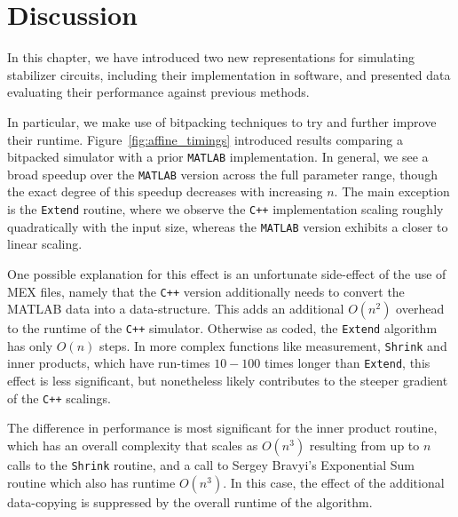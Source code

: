 \section{Discussion}
In this chapter, we have introduced two new representations for simulating stabilizer circuits, including their implementation in software, and presented data evaluating their performance against previous methods.\par
In particular, we make use of bitpacking techniques to try and further improve their runtime. Figure~\ref{fig:affine_timings} introduced results comparing a bitpacked simulator with a prior \texttt{MATLAB} implementation. In general, we see a broad speedup over the \texttt{MATLAB} version across the full parameter range, though the exact degree of this speedup decreases with increasing $n$. The main exception is the \texttt{Extend} routine, where we observe the \texttt{C++} implementation scaling roughly quadratically with the input size, whereas the \texttt{MATLAB} version exhibits a closer to linear scaling.\par
One possible explanation for this effect is an unfortunate side-effect of the use of MEX files, namely that the \texttt{C++} version additionally needs to convert the MATLAB data into a  data-structure. This adds an additional $O(n^{2})$ overhead to the runtime of the \texttt{C++} simulator. Otherwise as coded, the \texttt{Extend} algorithm has only $O(n)$ steps. In more complex functions like measurement, \texttt{Shrink} and inner products, which have run-times $10-100$ times longer than \texttt{Extend}, this effect is less significant, but nonetheless likely contributes to the steeper gradient of the \texttt{C++} scalings.\par
The difference in performance is most significant for the inner product routine, which has an overall complexity that scales as $O(n^{3})$ resulting from up to $n$ calls to the \texttt{Shrink} routine, and a call to Sergey Bravyi's Exponential Sum routine which also has runtime $O(n^{3})$. In this case, the effect of the additional data-copying is suppressed by the overall runtime of the algorithm. \par
